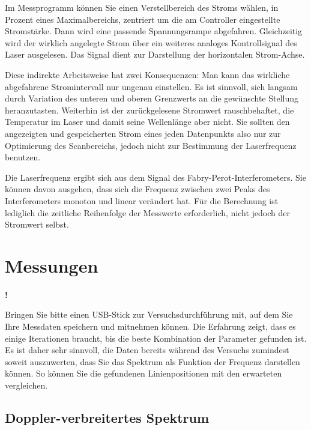 Im Messprogramm können Sie einen Verstellbereich des Stroms wählen, in Prozent eines Maximalbereichs, zentriert um die am Controller eingestellte Stromstärke. Dann wird eine passende Spannungsrampe abgefahren. Gleichzeitig wird der wirklich angelegte Strom über ein weiteres analoges Kontrollsignal des Laser ausgelesen. Das Signal dient zur Darstellung der horizontalen Strom-Achse.

Diese indirekte Arbeitsweise hat zwei Konsequenzen: Man kann das wirkliche abgefahrene Stromintervall nur ungenau einstellen. Es ist sinnvoll, sich langsam durch Variation des unteren und oberen Grenzwerts an die gewünschte Stellung heranzutasten. Weiterhin ist der zurückgelesene Stromwert rauschbehaftet, die Temperatur im Laser und damit seine Wellenlänge aber nicht. Sie sollten den angezeigten und gespeicherten Strom eines jeden Datenpunkts also nur zur Optimierung des Scanbereichs, jedoch nicht zur Bestimmung der Laserfrequenz benutzen.

Die Laserfrequenz ergibt sich aus dem Signal des Fabry-Perot-Interferometers. Sie können davon ausgehen, dass sich die Frequenz zwischen zwei Peaks des Interferometers monoton und linear verändert hat. Für die Berechnung ist lediglich die zeitliche Reihenfolge der Messwerte erforderlich, nicht jedoch der Stromwert selbst.


\section{Messungen}

\begin{marginfigure}[10mm]{\Huge \textbf{!}}\end{marginfigure}%
	Bringen Sie bitte einen USB-Stick zur Versuchsdurchführung mit, auf dem Sie Ihre Messdaten speichern und mitnehmen können.
Die Erfahrung zeigt, dass es einige Iterationen braucht, bis die beste Kombination der Parameter gefunden ist. Es ist daher sehr sinnvoll, die Daten bereits während des Versuchs zumindest soweit auszuwerten, dass Sie das Spektrum als Funktion der Frequenz darstellen können. So können Sie die gefundenen Linienpositionen mit den erwarteten vergleichen. 






\subsection{Doppler-verbreitertes Spektrum}

